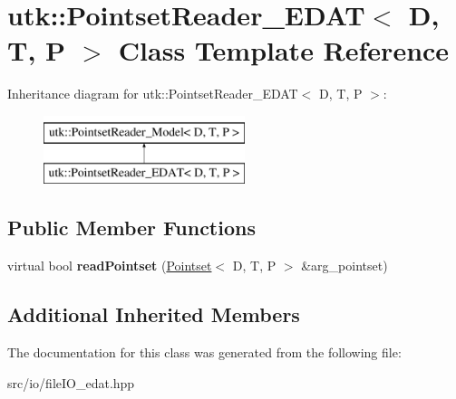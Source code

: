 \hypertarget{classutk_1_1PointsetReader__EDAT}{\section{utk\-:\-:Pointset\-Reader\-\_\-\-E\-D\-A\-T$<$ D, T, P $>$ Class Template Reference}
\label{classutk_1_1PointsetReader__EDAT}
}
Inheritance diagram for utk\-:\-:Pointset\-Reader\-\_\-\-E\-D\-A\-T$<$ D, T, P $>$\-:\begin{figure}[H]
\begin{center}
\leavevmode
\includegraphics[height=2.000000cm]{classutk_1_1PointsetReader__EDAT}
\end{center}
\end{figure}
\subsection*{Public Member Functions}
\begin{DoxyCompactItemize}
\item 
\hypertarget{classutk_1_1PointsetReader__EDAT_a087d77a2490ce6f92cd89b78129de13c}{virtual bool {\bfseries read\-Pointset} (\hyperlink{classutk_1_1Pointset}{Pointset}$<$ D, T, P $>$ \&arg\-\_\-pointset)}\label{classutk_1_1PointsetReader__EDAT_a087d77a2490ce6f92cd89b78129de13c}

\end{DoxyCompactItemize}
\subsection*{Additional Inherited Members}


The documentation for this class was generated from the following file\-:\begin{DoxyCompactItemize}
\item 
src/io/file\-I\-O\-\_\-edat.\-hpp\end{DoxyCompactItemize}
